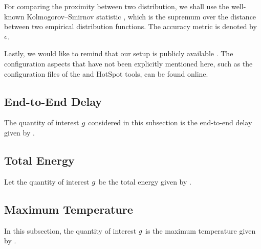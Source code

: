 For comparing the proximity between two distribution, we shall use the
well-known Kolmogorov--Smirnov statistic \cite{rao2009}, which is the supremum
over the distance between two empirical distribution functions. The accuracy
metric is denoted by $\epsilon$.

Lastly, we would like to remind that our setup is publicly available
\cite{sources}. The configuration aspects that have not been explicitly
mentioned here, such as the configuration files of the  and HotSpot
tools, can be found online.


\subsection{End-to-End Delay}
The quantity of interest $g$ considered in this subsection is the end-to-end
delay given by .

\subsection{Total Energy}
Let the quantity of interest $g$ be the total energy given by
.

\subsection{Maximum Temperature}
In this subsection, the quantity of interest $g$ is the maximum temperature
given by .
